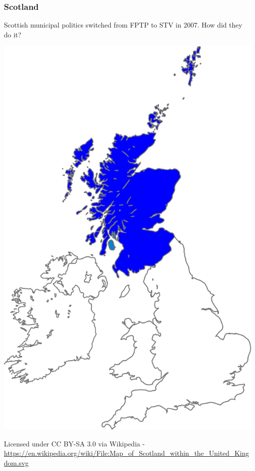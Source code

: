 \documentclass[14pt,t,hyperref={colorlinks=true,urlcolor=red}]{beamer}
\begin{document}
\begin{frame}
\frametitle{Scotland}

Scottish municipal politics switched from FPTP to STV in 2007. How did
they do it?

\begin{center}
\includegraphics[height=0.5\textheight]{pix/map-scotland-blue.png}
\end{center}

\tiny{ Licensed under CC BY-SA 3.0 via Wikipedia -
\url{https://en.wikipedia.org/wiki/File:Map_of_Scotland_within_the_United_Kingdom.svg}
}


\end{frame}


\end{document}
